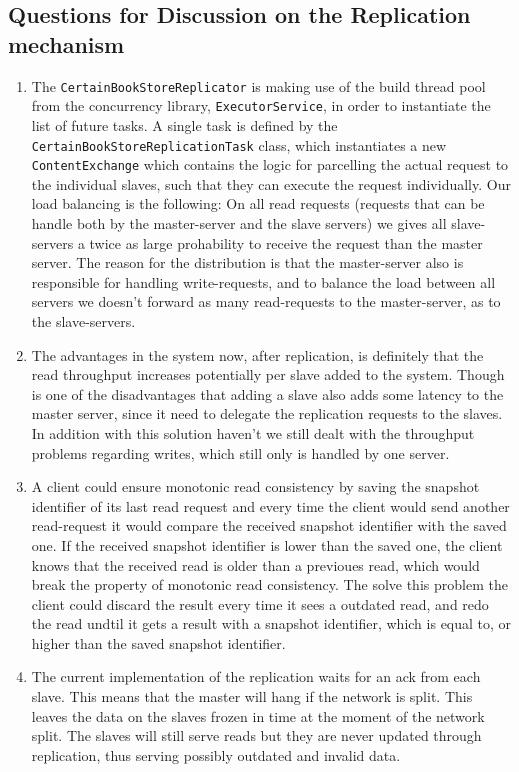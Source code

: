 \documentclass[10pt,a4paper]{article}
\begin{document}
\subsection*{Questions for Discussion on the Replication mechanism}
\begin{enumerate}
	\item The \texttt{CertainBookStoreReplicator} is making use of the build thread pool from the concurrency library, \texttt{ExecutorService}, in order to instantiate the list of future tasks. A single task is defined by the \texttt{CertainBookStore\-ReplicationTask} class, which instantiates a new \texttt{ContentExchange} which contains the logic for parcelling the actual request to the individual slaves, such that they can execute the request individually.
	\newline
	Our load balancing is the following: On all read requests (requests that can be handle both by the master-server and the slave servers) we gives all slave-servers a twice as large prohability to receive the request than the master server. The reason for the distribution is that the master-server also is responsible for handling write-requests, and to balance the load between all servers we doesn't forward as many read-requests to the master-server, as to the slave-servers.
	\item The advantages in the system now, after replication, is definitely that the read throughput increases potentially per slave added to the system. Though is one of the disadvantages that adding a slave also adds some latency to the master server, since it need to delegate the replication requests to the slaves. In addition with this solution haven't we still dealt with the throughput problems regarding writes, which still only is handled by one server.
	\item A client could ensure monotonic read consistency by saving the snapshot identifier of its last read request and every time the client would send another read-request it would compare the received snapshot identifier with the saved one. If the received snapshot identifier is lower than the saved one, the client knows that the received read is older than a previoues read, which would break the property of monotonic read consistency. The solve this problem the client could discard the result every time it sees a outdated read, and redo the read undtil it gets a result with a snapshot identifier, which is equal to, or higher than the saved snapshot identifier.
	\item The current implementation of the replication waits for an ack from each slave. This means that the master will hang if the network is split. This leaves the data on the slaves frozen in time at the moment of the network split. The slaves will still serve reads but they are never updated through replication, thus serving possibly outdated and invalid data.
\end{enumerate}
\end{document}
